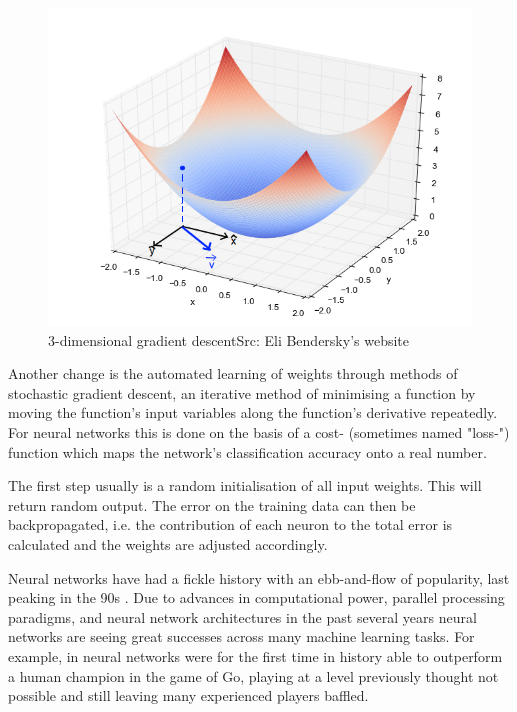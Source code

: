 \begin{figure}
  \vspace{-10pt}
    \centering
    \hspace{-25pt}
	\includegraphics[width=.55\textwidth]{./images/illustrations/gradient-descent}
    \caption{3-dimensional gradient descent\newline Src: Eli Bendersky's website}
    \label{fig:gradient-descent}
      \vspace{-15pt}
\end{figure}



Another change is the automated learning of weights through methods of stochastic gradient descent, an iterative method of minimising a function by moving the function's input variables along the function's derivative repeatedly. For neural networks this is done on the basis of a cost- (sometimes named "loss-") function which maps the network's classification accuracy onto a real number. 

The first step usually is a random initialisation of all input weights. This will return random output. The error on the training data can then be backpropagated, i.e. the contribution of each neuron to the total error is calculated and the weights are adjusted accordingly.

 

 Neural networks have had a fickle history with an ebb-and-flow of popularity, last peaking in the 90s \cite{Bengio91z}.  Due to advances in computational power, parallel processing paradigms, and neural network architectures in the past several years neural networks are seeing great successes across many machine learning tasks. For example, in \cite{Silver:2016aa} neural networks were for the first time in history able to outperform a human champion in the game of Go, playing at a level previously thought not possible and still leaving many experienced players baffled.  



